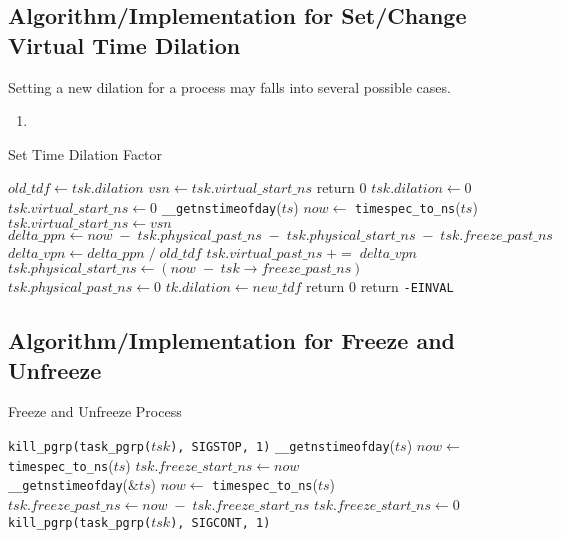 \documentclass{acm_proc_article-sp}
\begin{document}
\subsection{Algorithm/Implementation for Set/Change Virtual Time Dilation}
Setting a new dilation for a process may falls into several possible cases.
\begin{enumerate}
\item 
\end{enumerate}
\begin{algorithm*}[t]
\caption{Set Time Dilation Factor}
\label{Alg-SetTDF}
\begin{algorithmic}[1]
\State $old\_tdf \gets tsk.dilation$
\State $vsn \gets tsk.virtual\_start\_ns$
	\State return 0
	\State {}
	\State {}
	\State $tsk.dilation \gets 0$
	\State $tsk.virtual\_start\_ns \gets 0$
	\State \texttt{\_\_getnstimeofday}($ts$)
	\State $now \gets$ \texttt{timespec\_to\_ns}($ts$)
	\State $tsk.virtual\_start\_ns \gets vsn$
	\State $delta\_ppn \gets now \; - \; tsk.physical\_past\_ns \; - \; tsk. physical\_start\_ns \; - \; tsk. freeze\_past\_ns$
	\State $delta\_vpn \gets delta\_ppn \; / \; old\_tdf$
	\State $tsk.virtual\_past\_ns \; += \; delta\_vpn$
	\State $tsk.physical\_start\_ns \gets (now \; - \; tsk\rightarrow freeze\_past\_ns)$
	\State $tsk.physical\_past\_ns \gets 0$
	\State $tk.dilation \gets new\_tdf$
	\State return 0
\Else
	\State return \texttt{-EINVAL}
\EndIf
{}
	\State {}
\EndFor
\EndFunction
\end{algorithmic}
\end{algorithm*}

\subsection{Algorithm/Implementation for Freeze and Unfreeze}
\label{Sub-Sec-Alg-Impl-Freeze}
\begin{algorithm}[t]
\caption{Freeze and Unfreeze Process}
\label{Alg-Freeze}
\begin{algorithmic}[1]
\State \texttt{kill\_pgrp(task\_pgrp($tsk$), SIGSTOP, 1)}
\State \texttt{\_\_getnstimeofday}($ts$)
\State $now \gets$ \texttt{timespec\_to\_ns}($ts$)
\State $tsk.freeze\_start\_ns \gets now$
\EndFunction
\\
\State \texttt{\_\_getnstimeofday}(\&$ts$)
\State $now \gets$ \texttt{timespec\_to\_ns}($ts$)
\State $tsk.freeze\_past\_ns \gets now \; - \; tsk.freeze\_start\_ns$
\State $tsk.freeze\_start\_ns \gets 0$
\State \texttt{kill\_pgrp(task\_pgrp($tsk$), SIGCONT, 1)}
\EndFunction
\end{algorithmic}
\end{algorithm}
\end{document}
